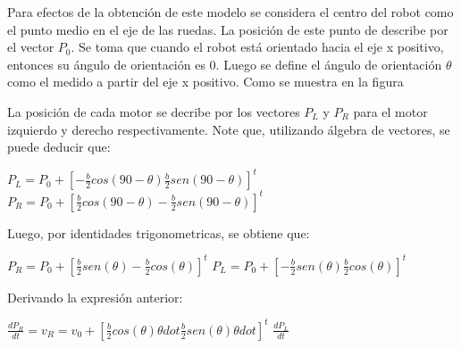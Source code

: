 

Para efectos de la obtención de este modelo se considera el centro del robot como el punto medio en el eje de las ruedas. La posición de este punto de describe por el vector $P_0$. Se toma que cuando el robot está orientado hacia el eje x positivo, entonces su ángulo de orientación es 0. Luego se define el ángulo de orientación $\theta$ como el medido a partir del eje x positivo. Como se muestra en la figura %

La posición de cada motor se decribe por los vectores $P_L$ y $P_R$ para el motor izquierdo y derecho respectivamente. Note que, utilizando álgebra de vectores, se puede deducir que:

$P_L=P_0+[-\frac{b}{2}cos(90-\theta)  \frac{b}{2}sen(90-\theta)]^t$
$P_R=P_0+[\frac{b}{2}cos(90-\theta)  -\frac{b}{2}sen(90-\theta)]^t$

Luego, por identidades trigonometricas, se obtiene que:

$P_R=P_0+[\frac{b}{2}sen(\theta)  -\frac{b}{2}cos(\theta)]^t$
$P_L=P_0+[-\frac{b}{2}sen(\theta)  \frac{b}{2}cos(\theta)]^t$
 
Derivando la expresión anterior:

$\frac{dP_R}{dt}=v_R=v_0+[\frac{b}{2}cos(\theta)\theta dot   \frac{b}{2}sen(\theta)\theta dot]^t$
$\frac{dP_L}{dt}$